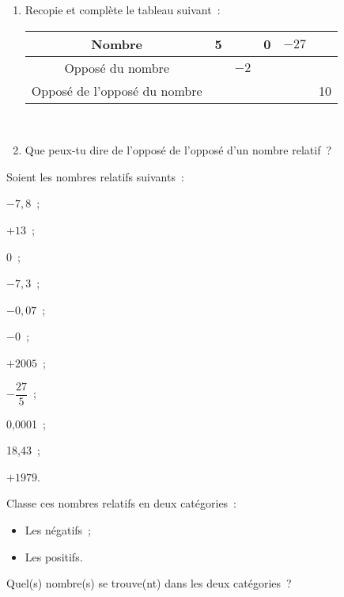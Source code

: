 \begin{exercice}
\begin{enumerate}
 \item Recopie et complète le tableau suivant : \\[0.5em]
 \begin{tabularx}{0.8\linewidth}{|c|X|X|X|X|X|}
  \hline
 Nombre & 5 & & 0 & $- 27$ & \\\hline
 Opposé du nombre & & $- 2$ & & & \\\hline
 Opposé de l'opposé du nombre & & & & & 10 \\\hline
  \end{tabularx} \\[0.5em]
 \item Que peux-tu dire de l'opposé de l'opposé d'un nombre relatif ?
 \end{enumerate}
\end{exercice}


\begin{exercice}[Classement]
Soient les nombres relatifs suivants :
\begin{colitemize}{3}
 \item $- 7,8$ ;
 \item $+ 13$ ;
 \item 0 ;
 \item $- 7,3$ ;
 \item $- 0,07$ ;
 \item $- 0$ ;
 \item $+ 2005$ ;
 \item $- \dfrac{27}{5}$ ;
 \item 0,0001 ;
 \item 18,43 ;
 \item $+ 1979$.
 \end{colitemize}
 
Classe ces nombres relatifs en deux catégories :
\begin{itemize}
 \item Les négatifs ;
 \item Les positifs.
 \end{itemize}
Quel(s) nombre(s) se trouve(nt) dans les deux catégories ?
\end{exercice}


